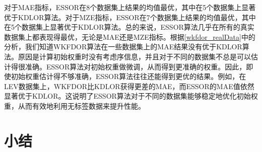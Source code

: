 对于MAE指标，ESSOR在8个数据集上结果的均值最优，其中在5个数据集上显著优于KDLOR算法。对于MZE指标，ESSOR在7个数据集上结果的均值最优，其中在5个数据集上显著优于KDLOR算法。总的来说，ESSOR算法几乎在所有的真实数据集上都表现得最优，无论是MAE还是MZE指标。根据\autoref{wkfdor_realData}中的分析，我们知道WKFDOR算法在一些数据集上的MAE结果没有优于KDLOR算法。原因是计算初始权重时没有考虑序信息，并且对于不同的数据集不总是可以估计得很准确。ESSOR算法对初始权重做微调，从而得到更准确的权重。因此，即使初始权重估计得不够准确，ESSOR算法往往还能得到更优的结果。例如，在LEV数据集上，WKFDOR比KDLOR获得更差的MAE，而ESSOR的MAE值依然显著优于KDLOR。这说明了ESSOR算法对于不同的数据集能够稳定地优化初始权重，从而有效地利用无标签数据来提升性能。

\section{小结}










